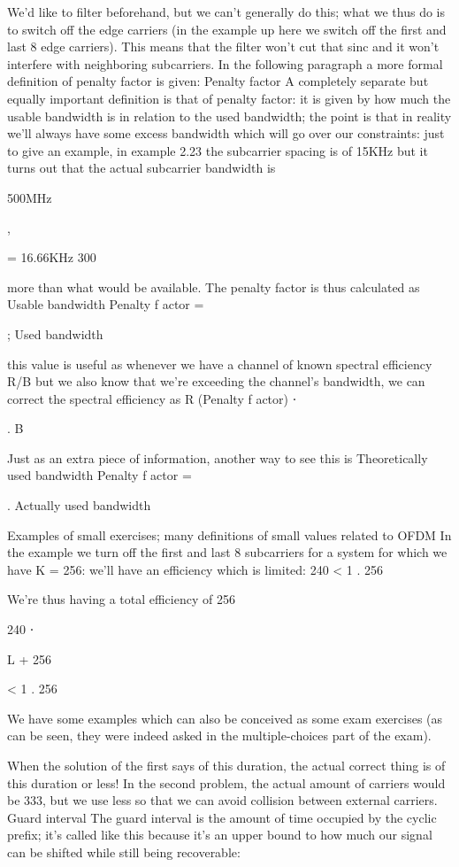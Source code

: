 {{{We'd like to filter beforehand, but we can't generally do this; what we thus do is to switch off the edge carriers (in the example up here we switch off the first and last 8 edge carriers).
This means that the filter won't cut that sinc and it won't interfere with neighboring subcarriers.
In the following paragraph a more formal definition of penalty factor is given:
Penalty factor A completely separate but equally important definition is that of penalty factor: it is given by how much the usable bandwidth is in relation to the used bandwidth; the point is that in reality we'll always have some excess bandwidth which will go over our constraints: just to give an example, in example 2.23 the subcarrier spacing is of 15KHz but it turns out that the actual subcarrier bandwidth is

500MHz

,

= 16.66KHz 300

more than what would be available. The penalty factor is thus calculated as Usable bandwidth Penalty f actor =

;
Used bandwidth

this value is useful as whenever we have a channel of known spectral efficiency R/B but we also know that we're exceeding the channel's bandwidth, we can correct the spectral efficiency as R
(Penalty f actor) ⋅

.
B

Just as an extra piece of information, another way to see this is Theoretically used bandwidth Penalty f actor =

.
Actually used bandwidth

Examples of small exercises; many definitions of small values related to OFDM In the example we turn off the first and last 8 subcarriers for a system for which we have K = 256: we'll have an efficiency which is limited:
240
< 1 .
256

We're thus having a total efficiency of 256

240
⋅

L + 256

< 1 .
256

We have some examples which can also be conceived as some exam exercises (as can be seen, they were indeed asked in the multiple-choices part of the exam).

When the solution of the first says of this duration, the actual correct thing is of this duration or less!
In the second problem, the actual amount of carriers would be 333, but we use less so that we can avoid collision between external carriers.
​Guard interval The guard interval is the amount of time occupied by the cyclic prefix; it's called like this because it's an upper bound to how much our signal can be shifted while still being recoverable:

}}}
